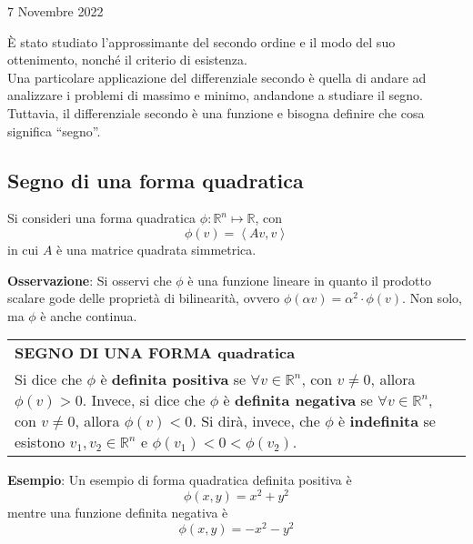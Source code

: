 \documentclass[a4paper]{extarticle}
\newcommand{\quotes}[1]{``#1''}
\renewcommand\arraystretch{}
\begin{document}
\newpage
\noindent
\begin{center}
    7 Novembre 2022
\end{center}
È stato studiato l'approssimante del secondo ordine e il modo del suo ottenimento, nonché il criterio di esistenza.\\
Una particolare applicazione del differenziale secondo è quella di andare ad analizzare i problemi di massimo e minimo, andandone a studiare il segno. Tuttavia, il differenziale secondo è una funzione e bisogna definire che cosa significa \quotes{segno}.

\vspace{1em}
\subsection{Segno di una forma quadratica}
Si consideri una forma quadratica $\phi : \mathbb{R}^n \longmapsto \mathbb{R}$, con
\[\phi(v) = \left<Av,v\right>\]
in cui $A$ è una matrice quadrata simmetrica.

\vspace{1em}
\noindent
\textbf{Osservazione}: Si osservi che $\phi$ è una funzione lineare in quanto il prodotto scalare gode delle proprietà di bilinearità, ovvero $\phi(\alpha v) = \alpha^2 \cdot \phi(v)$. Non solo, ma $\phi$ è anche continua.

\vspace{1em}
\setlength{\tabcolsep}{14pt}
\renewcommand{\arraystretch}{2}
\noindent
\begin{tabularx}{\textwidth}{@{}|P|@{}}
    \hline
    {\textbf{SEGNO DI UNA FORMA quadratica}}\\
    \parbox{\linewidth}{Si dice che $\phi$ è \textbf{definita positiva} se $\forall v \in \mathbb{R}^n$, con $v \neq 0$, allora $\phi(v) > 0$.\\
    Invece, si dice che $\phi$ è \textbf{definita negativa} se $\forall v \in \mathbb{R}^n$, con $v \neq 0$, allora $\phi(v) < 0$.\\
    Si dirà, invece, che $\phi$ è \textbf{indefinita} se esistono $v_1,v_2 \in \mathbb{R}^n$ e $\phi(v_1) < 0 < \phi(v_2)$.\vspace{3mm}}\\
    \hline
\end{tabularx}

\vspace{1em}
\noindent
\textbf{Esempio}: Un esempio di forma quadratica definita positiva è
\[\phi(x,y) = x^2 + y^2\]
mentre una funzione definita negativa è
\[\phi(x,y) = -x^2 - y^2\]
\end{document}
